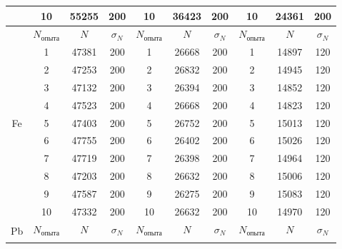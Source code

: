 \documentclass[a4paper, 12pt]{article}%
\begin{document}
\begin{table}[h]
\begin{center}
\begin{tabular}{|c|c|c|c|c|c|c|c|c|c|}
                     & 10                 & 55255 & 200        & 10                 & 36423 & 200        & 10                 & 24361 & 200        \\ \hline
\multirow{11}{*}{Fe} & $N_{\text{опыта}}$ & $N$   & $\sigma_N$ & $N_{\text{опыта}}$ & $N$   & $\sigma_N$ & $N_{\text{опыта}}$ & $N$   & $\sigma_N$ \\ \cline{2-10} 
                     & 1                  & 47381 & 200        & 1                  & 26668 & 200        & 1                  & 14897 & 120        \\ \cline{2-10} 
                     & 2                  & 47253 & 200        & 2                  & 26832 & 200        & 2                  & 14945 & 120        \\ \cline{2-10} 
                     & 3                  & 47132 & 200        & 3                  & 26394 & 200        & 3                  & 14852 & 120        \\ \cline{2-10} 
                     & 4                  & 47523 & 200        & 4                  & 26668 & 200        & 4                  & 14823 & 120        \\ \cline{2-10} 
                     & 5                  & 47403 & 200        & 5                  & 26752 & 200        & 5                  & 15013 & 120        \\ \cline{2-10} 
                     & 6                  & 47755 & 200        & 6                  & 26402 & 200        & 6                  & 15026 & 120        \\ \cline{2-10} 
                     & 7                  & 47719 & 200        & 7                  & 26398 & 200        & 7                  & 14964 & 120        \\ \cline{2-10} 
                     & 8                  & 47203 & 200        & 8                  & 26632 & 200        & 8                  & 15006 & 120        \\ \cline{2-10} 
                     & 9                  & 47587 & 200        & 9                  & 26275 & 200        & 9                  & 15083 & 120        \\ \cline{2-10} 
                     & 10                 & 47332 & 200        & 10                 & 26632 & 200        & 10                 & 14970 & 120        \\ \hline
\multirow{11}{*}{Pb} & $N_{\text{опыта}}$ & $N$   & $\sigma_N$ & $N_{\text{опыта}}$ & $N$   & $\sigma_N$ & $N_{\text{опыта}}$ & $N$   & $\sigma_N$ \\ \cline{2-10} 

\end{tabular}
\end{center}
\end{table}
\end{document}
